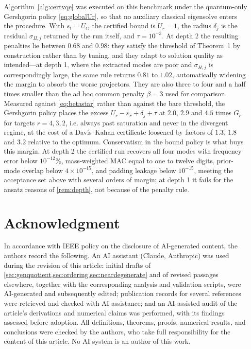 \documentclass{ieeeaccess}
\begin{document}
Algorithm~\ref{alg:certvqe} was executed on this benchmark under the quantum-only Gershgorin policy \cref{eq:globalUr}, so that no auxiliary classical eigensolve enters the procedure. With $s_t=U_G$ the certified bound is $U_r=1$, the radius $\delta_j$ is the residual $\sigma_{H,j}$ returned by the run itself, and $\tau=10^{-3}$. At depth 2 the resulting penalties lie between $0.68$ and $0.98$: they satisfy the threshold of Theorem~1 by construction rather than by tuning, and they adapt to solution quality as intended---at depth 1, where the extracted modes are poor and $\sigma_{H,j}$ is correspondingly large, the same rule returns $0.81$ to $1.02$, automatically widening the margin to absorb the worse projectors. They are also three to four and a half times smaller than the ad hoc common penalty $\beta=3$ used for comparison. Measured against \cref{eq:betastar} rather than against the bare threshold, the Gershgorin policy places the excess $U_r-\varepsilon_r+\delta_j+\tau$ at $2.0$, $2.9$ and $4.5$ times $G_r$ for targets $r=4,3,2$, i.e. always past saturation and never in the divergent regime, at the cost of a Davis--Kahan certificate loosened by factors of $1.3$, $1.8$ and $3.2$ relative to the optimum. Conservatism in the bound policy is what buys this margin. At depth 2 the certified run recovers all four modes with frequency error below $10^{-12}$\%, mass-weighted MAC equal to one to twelve digits, prior-mode overlap below $4\times10^{-15}$, and padding leakage below $10^{-15}$, meeting the acceptance set above with several orders of margin; at depth 1 it fails for the ansatz reasons of \cref{rem:depth}, not because of the penalty rule.

\section*{Acknowledgment}
In accordance with IEEE policy on the disclosure of AI-generated content, the authors record the following. An AI assistant (Claude, Anthropic) was used during the revision of this article: initial drafts of \cref{sec:genquotient,sec:ordering,sec:neardegenerate} and of revised passages elsewhere, together with the corresponding analysis and validation scripts, were AI-generated and subsequently edited; publication records for several references were retrieved and checked with AI assistance; and an AI-assisted audit of the article's derivations and numerical claims was performed, with its findings assessed before adoption. All definitions, theorems, proofs, numerical results, and conclusions were checked by the authors, who take full responsibility for the content of this article. No AI system is an author of this work.




\ifdefined\ACCESS\EOD\fi
\end{document}
